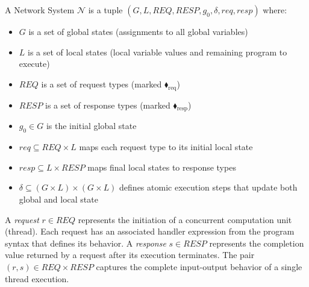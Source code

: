    
A Network System $\mathcal{N}$ is a tuple $(G, L, \mathit{REQ}, \mathit{RESP}, g_0, \delta, \mathit{req}, \mathit{resp})$ where:
\begin{itemize}
\item $G$ is a set of global states (assignments to all global variables)
\item $L$ is a set of local states (local variable values and remaining program to execute)
\item $\mathit{REQ}$ is a set of request types (marked {\color{ForestGreen}$\blacklozenge_\text{req}$})
\item $\mathit{RESP}$ is a set of response types (marked {\color{red}$\blacklozenge_\text{resp}$})
\item $g_0 \in G$ is the initial global state
\item $\mathit{req} \subseteq \mathit{REQ} \times L$ maps each request type to its initial local state
\item $\mathit{resp} \subseteq L \times \mathit{RESP}$ maps final local states to response types
\item $\delta \subseteq (G \times L) \times (G \times L)$ defines atomic execution steps that update both global and local state
\end{itemize}

\begin{definition}
A \emph{request} $r \in \mathit{REQ}$ represents the initiation of a concurrent computation unit (thread). Each request has an associated handler expression from the program syntax that defines its behavior.
A \emph{response} $s \in \mathit{RESP}$ represents the completion value returned by a request after its execution terminates.
The pair $(r, s) \in \mathit{REQ} \times \mathit{RESP}$ captures the complete input-output behavior of a single thread execution.
\end{definition}




